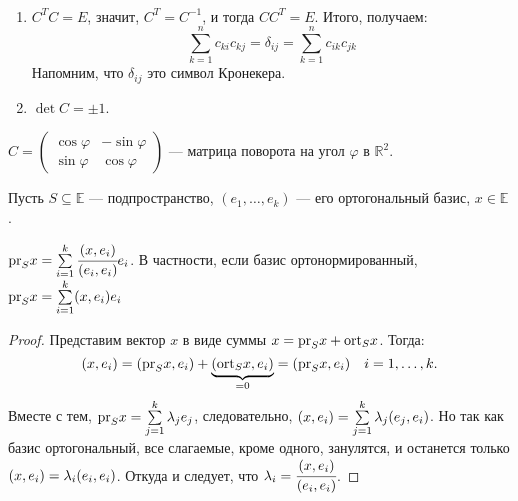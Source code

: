 \begin{Properties}\
\begin{enumerate}
\item $C^TC = E$, значит, $C^T = C^{-1}$, и тогда $CC^T = E$. Итого, получаем:
$$
\sum\limits_{k = 1}^{n}c_{ki}c_{kj} = \delta_{ij} = \sum\limits_{k = 1}^{n}c_{ik}c_{jk}
$$
Напомним, что $\delta_{ij}$ это символ Кронекера.
\item $\det C = \pm 1$.
\end{enumerate}
\end{Properties}

\begin{Examples}
	$C = \begin{pmatrix}
	\cos \varphi& -\sin \varphi\\
	\sin \varphi& \cos \varphi
	\end{pmatrix}$ --- матрица поворота на угол $\varphi$ в $\mathbb{R}^2$.
\end{Examples}

Пусть $S \subseteq \mathbb{E}$ --- подпространство, $(e_1, \ldots, e_k)$ --- его ортогональный базис, $x \in \mathbb{E}$.
\begin{Suggestion}
	$\mathrm{pr}_S x = \sum\limits_{i = 1}^{k}\cfrac{(x,e_i)}{(e_i, e_i)}e_i$. В частности, если базис ортонормированный, \\$\mathrm{pr}_S x = \sum\limits_{i = 1}^{k}(x,e_i)e_i$
\end{Suggestion}
\begin{proof}
Представим вектор $x$ в виде суммы $x = \mathrm{pr}_Sx + \mathrm{ort}_Sx$. Тогда:
$$
(x, e_i) = (\mathrm{pr}_S x, e_i) + \underbrace{(\mathrm{ort}_S x, e_i)}_{=0} = (\mathrm{pr}_S x, e_i) \quad i = 1, \ldots, k.
$$
Вместе с тем, $\mathrm{pr}_S x = \sum\limits_{j = 1}^{k}\lambda_je_j$, следовательно, $(x, e_i) = \sum\limits_{j = 1}^k\lambda_j(e_j, e_i)$.
Но так как базис ортогональный, все слагаемые, кроме одного, занулятся, и останется только $(x, e_i) = \lambda_i(e_i, e_i)$. Откуда и следует, что $\lambda_i = \cfrac{(x, e_i)}{(e_i, e_i)}$.
\end{proof}

